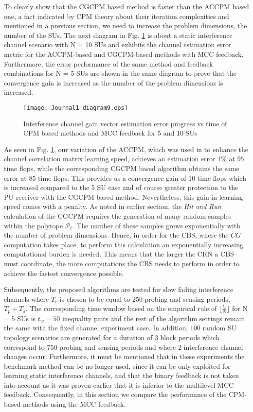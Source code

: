 \documentclass[journal]{IEEEtran}
\begin{document}
To clearly show that the CGCPM based method is faster than the ACCPM based one, a fact indicated by CPM theory about their iteration complexities and mentioned in a previous section, we need to increase the problem dimensions, the number of the SUs. The next diagram in Fig. \ref{fig11} is about a static interference channel scenario with N = 10 SUs and exhibits the channel estimation error metric for the ACCPM-based and CGCPM-based methods with MCC feedback. Furthermore, the error performance of the same method and feedback combinations for N = 5 SUs are shown in the same diagram to prove that the convergence gain is increased as the number of the problem dimensions is increased.
\begin{figure}[!h]
\centering
\texttt{[image: Journal1\_diagram9.eps]}
\caption{Interference channel gain vector estimation error progress vs time of CPM based methods and MCC feedback for 5 and 10 SUs}
\label{fig11}
\end{figure}
As seen in Fig. \ref{fig11}, our variation of the ACCPM, which was used in \cite{biban73} to enhance the channel correlation matrix learning speed, achieves an estimation error $1\%$ at $95$ time flops, while the corresponding CGCPM based algorithm obtains the same error at $85$ time flops. This provides us a convergence gain of $10$ time flops which is increased compared to the 5 SU case and of course greater protection to the PU receiver with the CGCPM based method. Nevertheless, this gain in learning speed comes with a penalty. As noted in earlier section, the \textit{Hit and Run} calculation of the CGCPM requires the generation of many random samples within the polytope $\mathcal{P}_{t}$. The number of these samples grows exponentially with the number of problem dimensions. Hence, in order for the CBS, where the $CG$ computation takes place, to perform this calculation an exponentially increasing computational burden is needed. This means that the larger the CRN a CBS must coordinate, the more computations the CBS needs to perform in order to achieve the fastest convergence possible.

Subsequently, the proposed algorithms are tested for slow fading interference channels where $T_{c}$ is chosen to be equal to $250$ probing and sensing periods, $T_{p}+T_{s}$. The corresponding time window based on the empirical rule of $\lfloor\frac{t_{c}}{N}\rfloor$ for N = 5 SUs is $t_{w}=50$ inequality pairs and the rest of the algorithm settings remain the same with the fixed channel experiment case. In addition, $100$ random SU topology scenarios are generated for a duration of $3$ block periods which correspond to $750$ probing and sensing periods and where $2$ interference channel changes occur. Furthermore, it must be mentioned that in these experiments the benchmark method can be no longer used, since it can be only exploited for learning static interference channels, and that the binary feedback is not taken into account as it was proven earlier that it is inferior to the multilevel MCC feedback. Consequently, in this section we compare the performance of the CPM-based methods using the MCC feedback.
\end{document}
